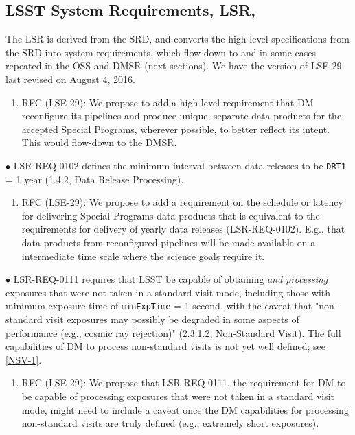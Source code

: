 \documentclass[DM,lsstdraft,toc]{lsstdoc}
\begin{document}
\subsection{LSST System Requirements, LSR, }\label{ssec:docrev_lsr}

The LSR is derived from the SRD, and converts the high-level specifications from the SRD into system requirements, which flow-down to and in some cases repeated in the OSS and DMSR (next sections). We have the version of LSE-29 last revised on August 4, 2016.

\begin{enumerate}[resume,topsep=-10pt,after=\vspace{10pt},label= \textbf{Action \Roman*}] \item \label{LSR-0} RFC (LSE-29): We propose to add a high-level requirement that DM reconfigure its pipelines and produce unique, separate data products for the accepted Special Programs, wherever possible, to better reflect its intent. This would flow-down to the DMSR. \end{enumerate}

$\bullet$ LSR-REQ-0102 defines the minimum interval between data releases to be \texttt{DRT1} = 1 year (1.4.2, Data Release Processing).
\begin{enumerate}[resume,topsep=-10pt,after=\vspace{10pt},label= \textbf{Action \Roman*}] \item \label{LSR-1} RFC (LSE-29): We propose to add a requirement on the schedule or latency for delivering Special Programs data products that is equivalent to the requirements for delivery of yearly data releases (LSR-REQ-0102). E.g., that data products from reconfigured pipelines will be made available on a intermediate time scale where the science goals require it. \end{enumerate}

$\bullet$ LSR-REQ-0111 requires that LSST be capable of obtaining \textit{and processing} exposures that were not taken in a standard visit mode, including those with minimum exposure time of \texttt{minExpTime} = 1 second, with the caveat that "non-standard visit exposures may possibly be degraded in some aspects of performance (e.g., cosmic ray rejection)" (2.3.1.2, Non-Standard Visit). The full capabilities of DM to process non-standard visits is not yet well defined; see \ref{NSV-1}.
\begin{enumerate}[resume,topsep=-10pt,after=\vspace{10pt},label= \textbf{Action \Roman*}] \item \label{LSR-2} RFC (LSE-29): We propose that LSR-REQ-0111, the requirement for DM to be capable of processing exposures that were not taken in a standard visit mode, might need to include a caveat once the DM capabilities for processing non-standard visits are truly defined (e.g., extremely short exposures). \end{enumerate}
\end{document}
